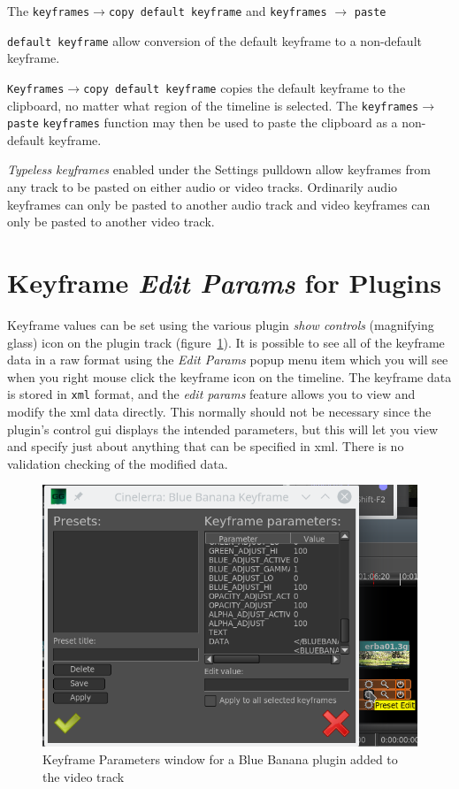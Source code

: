 The \texttt{keyframes$\rightarrow$copy default keyframe} and \texttt{keyframes} $\rightarrow$ \texttt{paste} {\texttt{de\-fault keyframe} allow conversion of the default keyframe to a non-default key\-fra\-me.

\texttt{Keyframes$\rightarrow$copy default keyframe} copies the default keyframe to the clipboard, no matter what region of the timeline is selected.  
The \texttt{keyframes}$\rightarrow$ \texttt{pas\-te} \texttt{keyframes} function may then be used to paste the clipboard as a non-default keyframe.  

\textit{Typeless keyframes} enabled under the Settings pulldown allow keyframes from any track to be pasted on either audio or video tracks.  Ordinarily audio keyframes can only be pasted to another audio track and video keyframes can only be pasted to another video track.

\section{Keyframe \textit{Edit Params} for Plugins}%
\label{sec:keyframe_edit_params_plugin}

Keyframe values can be set using the various plugin \textit{show controls} (magnifying glass) icon on the plugin track (figure~\ref{fig:parameters}).  It is possible to see all of the keyframe data in a raw format using the \textit{Edit Params} popup menu item which you will see when you right mouse click the keyframe icon on the timeline.  The keyframe data is stored in \texttt{xml} format, and the \textit{edit params} feature allows you to view and modify the xml data directly.  This normally should not be necessary since the plugin's control gui displays the intended parameters, but this will let you view and specify just about anything that can be specified in xml.  There is no validation checking of the modified data.

\begin{figure}[htpb]
    \centering
    \includegraphics[width=0.8\linewidth]{images/parameters.png}
    \caption{Keyframe Parameters window for a Blue Banana plugin added to the video track}
    \label{fig:parameters}
\end{figure}

}
